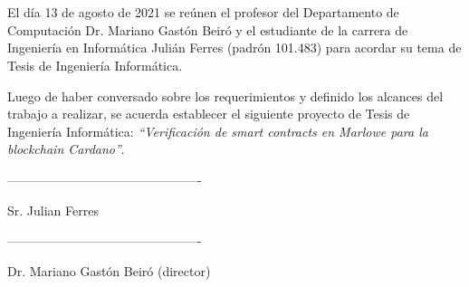 \documentclass[a4paper, 12pt]{iopart}
\begin{document}

\maketitle

\section*{}\label{carta}

\vspace{0.4cm}

\justify
El día 13 de agosto de 2021 se reúnen el profesor del Departamento de Computación Dr. Mariano Gastón Beiró y el estudiante de la carrera de Ingeniería en Informática Julián Ferres (padrón 101.483) para acordar su tema de Tesis de Ingeniería Informática.

\justify
Luego de haber conversado sobre los requerimientos y definido los alcances del trabajo a realizar, se acuerda establecer el siguiente proyecto de Tesis de Ingeniería Informática: \textit{``Verificación de smart contracts en Marlowe para la blockchain Cardano''}.

\vspace{2.5cm}

----------------------------------------------

\hspace{0.30cm} Sr. Julian Ferres

\vspace{2.0cm}

----------------------------------------------

\hspace{0.05cm} Dr. Mariano Gastón Beiró (director)

\vspace{2.0cm}
\end{document}
